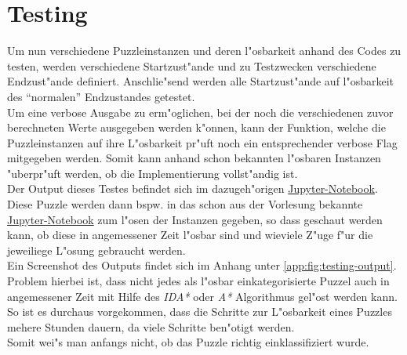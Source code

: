 \section{Testing} %
\label{cha:Testing}
Um nun verschiedene Puzzleinstanzen und deren l"osbarkeit anhand des Codes zu testen, werden verschiedene Startzust"ande und zu Testzwecken verschiedene Endzust"ande definiert. Anschlie"send werden alle Startzust"ande auf l"osbarkeit des \enquote{normalen} Endzustandes getestet.\\
Um eine verbose Ausgabe zu erm"oglichen, bei der noch die verschiedenen zuvor berechneten Werte ausgegeben werden k"onnen, kann der Funktion, welche die Puzzleinstanzen auf ihre L"osbarkeit pr"uft noch ein entsprechender verbose Flag mitgegeben werden. Somit kann anhand schon bekannten l"osbaren Instanzen "uberpr"uft werden, ob die Implementierung vollst"andig ist.\\
Der Output dieses Testes befindet sich im dazugeh"origen \textcolor{violet}{\href{https://github.com/stubifox/ai-termpaper/blob/main/code/15-solvable-v1.ipynb}{Jupyter-Notebook}}.\\
Diese Puzzle werden dann bspw. in das schon aus der Vorlesung bekannte \textcolor{violet}{\href{https://github.com/karlstroetmann/Artificial-Intelligence/blob/master/Python/1\%20Search/Iterative-Deepening-A-Star-Search.ipynb}{Jupyter-Notebook}} zum l"osen der Instanzen gegeben, so dass geschaut werden kann, ob diese in angemessener Zeit l"osbar sind und wieviele Z"uge f"ur die jeweiliege L"osung gebraucht werden. \\
Ein Screenshot des Outputs findet sich im Anhang unter \ref{app:fig:testing-output}.
Problem hierbei ist, dass nicht jedes als l"osbar einkategorisierte Puzzel auch in angemessener Zeit mit Hilfe des \textit{IDA*} oder \textit{A*} Algorithmus gel"ost werden kann. So ist es durchaus vorgekommen, dass die Schritte zur L"osbarkeit eines Puzzles mehere Stunden dauern, da viele Schritte ben"otigt werden.\\
Somit wei"s man anfangs nicht, ob das Puzzle richtig einklassifiziert wurde.
